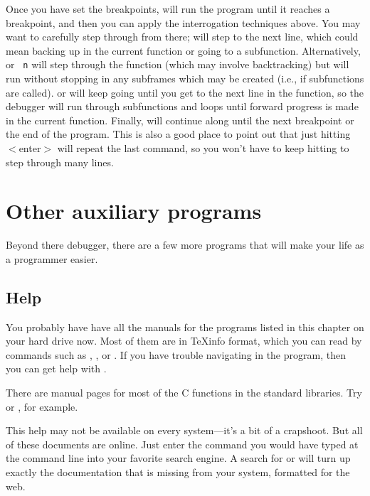 \documentclass[12pt]{article}
\begin{document}
Once you have set the breakpoints,  will run the program until it
reaches a breakpoint, and then you can apply the interrogation techniques
above. You may want to carefully step through from there; 
will step to the next line, which could mean backing up in the current
function or going to a subfunction. Alternatively,  or {\tt
n} will step through the function (which may involve backtracking) but
will run without stopping in any subframes which may be created
(i.e., if subfunctions are called).   or  will keep
going until you get to the next line in the function, so the debugger
will run through subfunctions and loops until forward progress is made
in the current function.  Finally,  will continue along until the next
breakpoint or the end of the program. This is also a good place to
point out that just hitting $<$enter$>$ will repeat the last command,
so you won't have to keep hitting  to step through many lines.

\section{\treesymbol{} Other auxiliary programs} 
Beyond there debugger, there
are a few more programs that will make your life as a programmer easier.

\subsection{Help} 
You probably have have all the manuals for the programs listed in this
chapter on your hard drive now. Most of them are in \TeX info format,
which you can read by commands such as , ,
or . If you have trouble navigating in the 
program, then you can get help with .

There are manual pages for most of the C functions in the standard libraries. Try
 or , for example.

This help may not be available on every system---it's a bit of
a crapshoot. But all of these documents are online. Just enter the
command you would have typed at the command line into your favorite
search engine. A search for  or  will
turn up exactly the documentation that is missing from your system,
formatted for the web.
\end{document}
